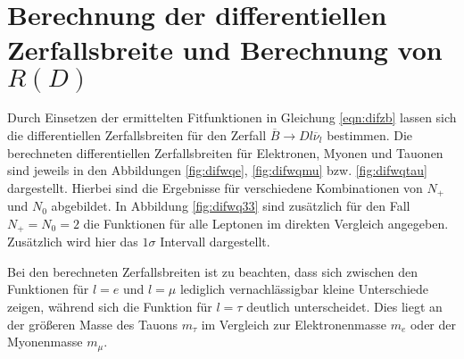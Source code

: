 \section{Berechnung der differentiellen Zerfallsbreite und Berechnung von \texorpdfstring{${R(D)}$}{R(D)}}
Durch Einsetzen der ermittelten Fitfunktionen in Gleichung \eqref{eqn:difzb} lassen sich die differentiellen Zerfallsbreiten für den Zerfall $\overline{B} \to D l \overline{\nu}_l$ bestimmen.
Die berechneten differentiellen Zerfallsbreiten für Elektronen, Myonen und Tauonen sind jeweils in den Abbildungen \ref{fig:difwqe}, \ref{fig:difwqmu} bzw. \ref{fig:difwqtau} dargestellt.
Hierbei sind die Ergebnisse für verschiedene Kombinationen von $N_+$ und $N_0$ abgebildet.
In Abbildung \ref{fig:difwq33} sind zusätzlich für den Fall $N_+=N_0=\num{2}$ die Funktionen für alle Leptonen im direkten Vergleich angegeben.
Zusätzlich wird hier das $\num{1}\sigma$ Intervall dargestellt.

Bei den berechneten Zerfallsbreiten ist zu beachten, dass sich zwischen den Funktionen für $l = e$ und $l = \mu$ lediglich vernachlässigbar kleine Unterschiede zeigen, während sich die Funktion für $l = \tau$ deutlich unterscheidet.
Dies liegt an der größeren Masse des Tauons $m_{\tau}$ im Vergleich zur Elektronenmasse $m_{e}$ oder der Myonenmasse $m_{\mu}$.

